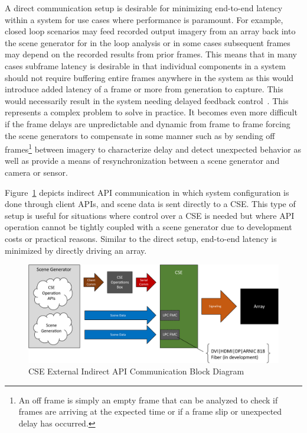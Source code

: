         A direct communication setup is desirable for minimizing end-to-end latency within a system for use cases where performance is paramount. For example, closed loop scenarios may feed recorded output imagery from an array back into the scene generator for in the loop analysis or in some cases subsequent frames may depend on the recorded results from prior frames. This means that in many cases subframe latency is desirable in that individual components in a system should not require buffering entire frames anywhere in the system as this would introduce added latency of a frame or more from generation to capture. This would necessarily result in the system needing delayed feedback control~\cite{HuWang2002}. This represents a complex problem to solve in practice. It becomes even more difficult if the frame delays are unpredictable and dynamic from frame to frame forcing the scene generators to compensate in some manner such as by sending off frames\footnote{An off frame is simply an empty frame that can be analyzed to check if frames are arriving at the expected time or if a frame slip or unexpected delay has occurred.} between imagery to characterize delay and detect unexpected behavior as well as provide a means of resynchronization between a scene generator and camera or sensor.

        Figure~\ref{fig:external_cse_comm_half_indirect} depicts indirect API communication in which system configuration is done through client APIs, and scene data is sent directly to a CSE. This type of setup is useful for situations where control over a CSE is needed but where API operation cannot be tightly coupled with a scene generator due to development costs or practical reasons. Similar to the direct setup, end-to-end latency is minimized by directly driving an array.

        \begin{figure}
            \centering
            \includegraphics[width=1.0\textwidth]{fig/external_cse_comm_half_indirect.pdf}
            \caption{CSE External Indirect API Communication Block Diagram}
            \label{fig:external_cse_comm_half_indirect}
        \end{figure}

